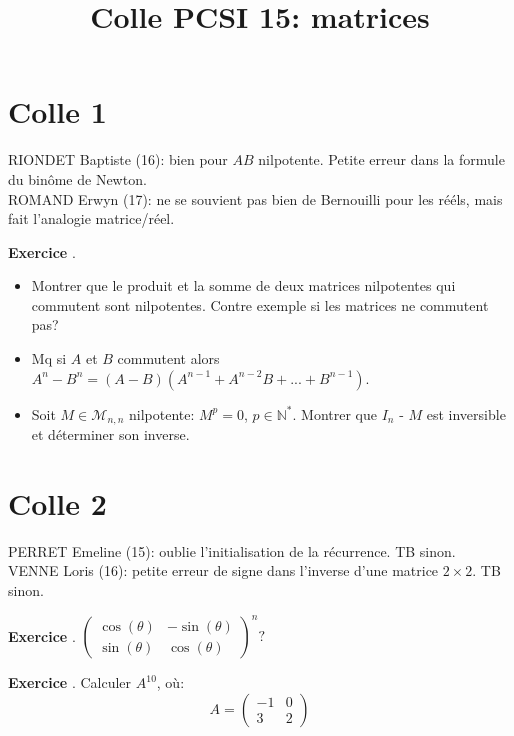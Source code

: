 \documentclass[10pt,a4paper]{article}
\title{Colle PCSI 15: matrices}
\newcounter{question}
\newcounter{exo}
\newenvironment{exo}{\vspace{0.5cm}\setcounter{question}{0}\addtocounter{exo}{1} \noindent \textbf{Exercice \theexo}. \normalsize }{\par}
\begin{document}
	\maketitle
\section*{Colle 1}
\setcounter{exo}{0}
RIONDET Baptiste (16): bien pour $AB$ nilpotente. Petite erreur dans la formule du binôme de Newton.\\
ROMAND Erwyn (17): ne se souvient pas bien de Bernouilli pour les rééls, mais fait l'analogie matrice/réel.\\

\begin{exo}
	\begin{itemize}
		\item Montrer que le produit et la somme de deux matrices nilpotentes qui commutent sont nilpotentes. Contre exemple si les matrices ne commutent pas?
		\item Mq si $A$ et $B$ commutent alors $A^n - B^n = (A - B)(A^{n-1} + A^{n-2}B + ... + B^{n-1})$.
		\item Soit $M \in \mathcal{M}_{n, n}$ nilpotente: $M^p = 0$, $p \in \mathbb{N}^*$. Montrer que $I_n$ - $M$ est inversible et déterminer son inverse.
	\end{itemize}
\end{exo}

	\section*{Colle 2}
	PERRET Emeline (15): oublie l'initialisation de la récurrence. TB sinon.\\
	VENNE Loris (16): petite erreur de signe dans l'inverse d'une matrice $2\times2$. TB sinon.\\
	
	\begin{exo}
		$\begin{pmatrix}
		\cos(\theta) & -\sin(\theta) \\ 
		\sin(\theta) & \cos(\theta)
		\end{pmatrix}^n ?$
	\end{exo}	

	\begin{exo}
		Calculer $A^{10}$, où:
		$$A = \begin{pmatrix}
		-1 & 0 \\ 
		3 & 2 
		\end{pmatrix}$$
	\end{exo}
\end{document}
